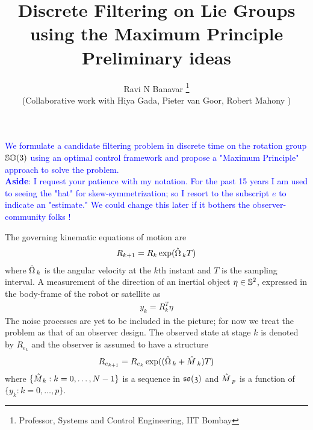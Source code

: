 \documentclass[12pt]{article}
\title{Discrete Filtering on Lie Groups using the Maximum Principle 
\\ \small{Preliminary ideas}}
\author{ 
%
{Ravi N Banavar \thanks{Professor, Systems and Control
Engineering, IIT Bombay}  \\
(Collaborative work with Hiya Gada, Pieter van Goor, Robert Mahony )}
}
\date{}
\begin{document}
\maketitle 
% 
\thispagestyle{empty} 
%
% 
\textcolor{blue}{We formulate a candidate filtering problem in discrete time on the rotation group 
$\mathbb{SO}(3)$ using an optimal control framework 
and propose a "Maximum Principle" approach to solve the problem.
\\
{\bf Aside}: I request your patience with my notation. For the past 15 years I am used to seeing the 
"hat" for skew-symmetrization; so I resort to the subscript $e$ to indicate an "estimate." We could change 
this later if it bothers the observer-community folks !}
%

 The governing kinematic equations of motion are
 	\begin{align}
		R_{k+1} = R_k \exp (\mathop{\hat{\Omega}}{}_k T)
	\end{align}
 where $\mathop{\hat{\Omega}}{}_k$ is the angular velocity at the $k$th instant and $T$ is the sampling interval.
A measurement of the direction of an inertial object $\eta \in \mathbb{S}^{2}$, expressed in the body-frame of the robot 
 or satellite as
 	\begin{align}
		y_k = R_k^T \eta
	\end{align}
The noise processes are yet to be included in the picture; for now we treat the problem as that 
of an observer design. The observed state at stage $k$ is denoted by $R_{e_k}$ and the observer
is assumed to have a structure
%
 	\begin{align}
		R_{e_{k+1}} = R_{e_{k}} \exp (( \mathop{\hat{\Omega}}{} _k + \mathop{\hat{M}}{}_k)T)
	\end{align}
where $\{ \mathop{\hat{M}}_k : k = 0, \ldots, N-1\} $ is a sequence in $\mathfrak{so(3)}$ and $\mathop{\hat{M}}{}_p$ is a 
function of $ \{ y_k : k = 0, \ldots, p\} $.
\end{document}
